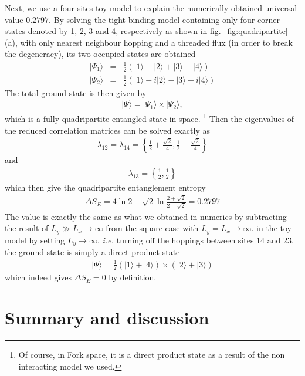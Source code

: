 \documentclass[doublecol]{epl2} %
\newcommand{\ie}{\textit{i.e.{ }}}
\begin{document}
Next, we use a four-sites toy model to explain the numerically obtained universal value $0.2797$. By solving the tight binding model containing only four corner states denoted by 1, 2, 3 and 4, respectively\revision{,} as shown in fig.~\ref{fig:quadripartite}(a), with only nearest neighbour hopping and a threaded flux (in order to break the degeneracy), \cite{Benalcazar_S_2017} its two occupied states are obtained 
\begin{eqnarray}
|\Psi_1\rangle&=&\frac12\left(|1\rangle-|2\rangle+|3\rangle-|4\rangle\right) \nonumber\\
|\Psi_2\rangle&=&\frac12\left(|1\rangle-i|2\rangle-|3\rangle+i|4\rangle\right) \nonumber
\end{eqnarray}
The total ground state is then given by
\begin{eqnarray}
|\Psi\rangle=|\Psi_1\rangle \times |\Psi_2\rangle,
\end{eqnarray}
which is a fully quadripartite entangled state in space. \footnote{Of course, in Fork space, it is a direct product state as a result of the non interacting model we used.} Then the eigenvalues of the reduced correlation matrices can be solved exactly as
\begin{eqnarray}
\lambda_{12}=\lambda_{14}=\left\{\frac{1}{2}+\frac{\sqrt{2}}{4},\frac{1}{2}-\frac{\sqrt{2}}{4}\right\} \nonumber
\end{eqnarray}
and
\begin{eqnarray}
\lambda_{13}=\left\{\frac{1}{2},\frac{1}{2}\right\} \nonumber
\end{eqnarray}
which then give the quadripartite entanglement entropy
\begin{eqnarray}
\Delta S_E= 4\ln2-\sqrt{2}\ln\frac{2+\sqrt{2}}{2-\sqrt{2}}=0.2797
\end{eqnarray}
The value is exactly the same as what we obtained in numerics by subtracting the result of $L_y\gg L_x\rightarrow\infty$ from the square case with $L_y=L_x\rightarrow\infty$.  in the toy model by setting $L_y\rightarrow\infty$, \ie {} turning off the hoppings between sites $14$ and
$23$, the ground state is simply a direct product state
\begin{eqnarray}
|\Psi\rangle=\frac12 \left(|1\rangle+|4\rangle\right) \times \left(|2\rangle+|3\rangle\right)
\end{eqnarray}
which indeed gives $\Delta S_E=0$ by definition. 

\section{Summary and discussion}
\end{document}
